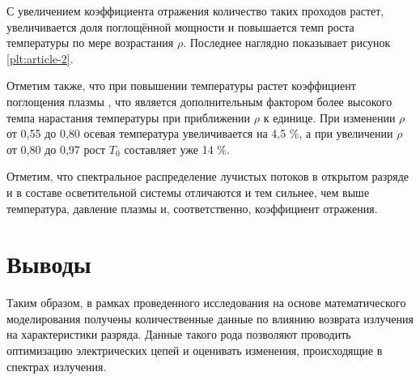 С увеличением коэффициента отражения количество таких проходов растет, увеличивается доля поглощённой мощности и повышается темп роста температуры по мере возрастания $\rho$.
Последнее наглядно показывает рисунок \ref{plt:article-2}.

Отметим также, что при повышении температуры растет коэффициент поглощения плазмы \cite{article-8-gradov, article-9-gradov}, что является дополнительным фактором более высокого темпа нарастания температуры при приближении $\rho$ к единице.
При изменении $\rho$ от 0,55 до 0,80 осевая температура увеличивается на 4,5 \%, а при увеличении $\rho$ от 0,80 до 0,97 рост $T_0$ составляет уже 14 \%.

Отметим, что спектральное распределение лучистых потоков в открытом разряде и в составе осветительной системы отличаются и тем сильнее, чем выше температура, давление плазмы и, соответственно, коэффициент отражения.

\section*{Выводы}

Таким образом, в рамках проведенного исследования на основе математического моделирования получены количественные данные по влиянию возврата излучения на характеристики разряда.
Данные такого рода позволяют проводить оптимизацию электрических цепей и оценивать изменения, происходящие в спектрах излучения.
